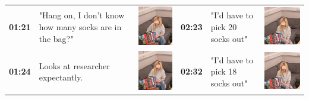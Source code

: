 \documentclass[twocolumn, issue, empirical, authordate,drafn]{jote-new-article}
\begin{document}
\begin{table}[ht!]
\begin{fullwidth}
\begin{tabularx}{\linewidth}{@{} m{.05\linewidth} m{.28\linewidth} >{\raggedleft\arraybackslash}m{.1\linewidth}  m{.05\linewidth} m{.28\linewidth} >{\raggedleft\arraybackslash}m{.1\linewidth} @{}}
\textbf{01:21} & "Hang on, I don't know how many socks are in the bag?" & \includegraphics[height=.09\textheight, valign=t]{media/image15.png} & 
 \textbf{02:23} & "I'd have to pick 20 socks out" & \includegraphics[height=.09\textheight, valign=t]{media/image23.png} \\ 
 
\textbf{01:24} & Looks at researcher expectantly. & \includegraphics[height=.09\textheight, valign=t]{media/image16.png} &
 \textbf{02:32} & "I'd have to pick 18 socks out" & \includegraphics[height=.09\textheight, valign=t]{media/image24.png} \\ 
 

\end{tabularx}
\end{fullwidth}
\end{table}
\end{document}
